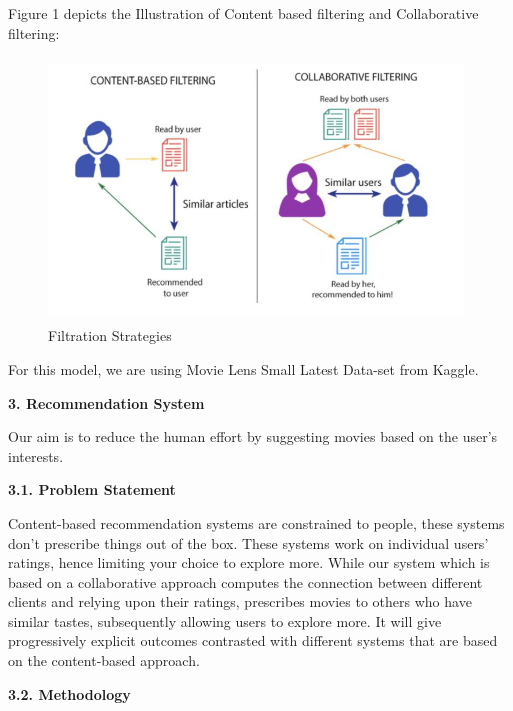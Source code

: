 \documentclass{article}
\begin{document}
Figure 1 depicts the Illustration of Content based filtering and Collaborative filtering:

\begin{figure}[htp]
    \centering
    \Large\includegraphics[width=11cm, height=7cm]{FitrationStrategy.JPG}
    \caption{Filtration Strategies}
    \label{fig:FitrationStrategy}
\end{figure}

For this model, we are using Movie Lens Small Latest Data-set from Kaggle.
\\

\begin{flushleft}
\textbf{\large 3. Recommendation System}
\end{flushleft}

Our aim is to reduce the human effort by suggesting movies based on the user’s interests.\\

\begin{flushleft}
\textbf{3.1. Problem Statement}
\end{flushleft}

Content-based recommendation systems are constrained to people, these systems don't prescribe things out of the box. These systems work on individual users’ ratings, hence limiting your choice to explore more. While our system which is based on a collaborative approach computes the connection between different clients and relying upon their ratings, prescribes movies to others who have similar tastes, subsequently allowing users to explore more. It will give progressively explicit outcomes contrasted with different systems that are based on the content-based approach. \\

\begin{flushleft}
\textbf{3.2. Methodology}
\end{flushleft}
\end{document}
